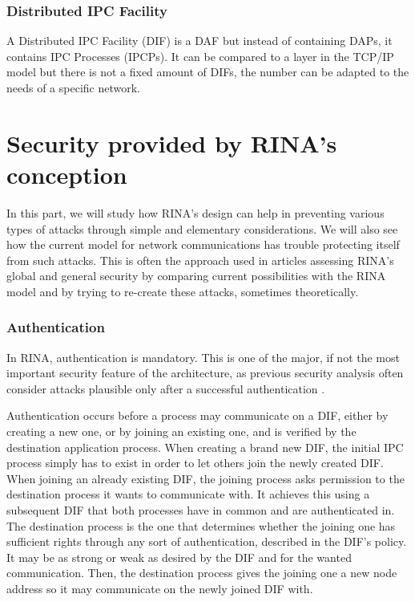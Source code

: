 \documentclass[a4paper]{proc}
\begin{document}
\section{Distributed IPC Facility}
A Distributed IPC Facility (DIF) is a DAF but instead of containing DAPs, it contains IPC Processes (IPCPs).
It can be compared to a layer in the TCP/IP model but there is not a fixed amount of DIFs, the number can be adapted to the needs of a specific network.


\part{Security provided by RINA's conception}

\par In this part, we will study how RINA's design can help in preventing
various types of attacks through simple and elementary considerations. We will
also see how the current model for network communications has trouble protecting
itself from such attacks. This is often the approach used in articles assessing
RINA's global and general security by comparing current possibilities with the
RINA model and by trying to re-create these attacks, sometimes theoretically.

\section{Authentication}

\par In RINA, authentication is mandatory. This is one of the major, if not the
most important security feature of the architecture, as previous security
analysis often consider attacks plausible only after a successful authentication
\cite{assessing-security, wiki, PINS}.

\par Authentication occurs before a process may communicate on a DIF, either by
creating a new one, or by joining an existing one, and is verified by the
destination application process. When creating a brand new DIF, the initial IPC
process simply has to exist in order to let others join the newly created DIF.
When joining an already existing DIF, the joining process asks permission to the
destination process it wants to communicate with. It achieves this using a
subsequent DIF that both processes have in common and are authenticated in.
The destination process is the one that determines whether the joining one has
sufficient rights through any sort of authentication, described in the DIF's
policy. It may be as strong or weak as desired by the DIF and for the wanted
communication. Then, the destination process gives the joining one a new
node address so it may communicate on the newly joined DIF with.
\end{document}
